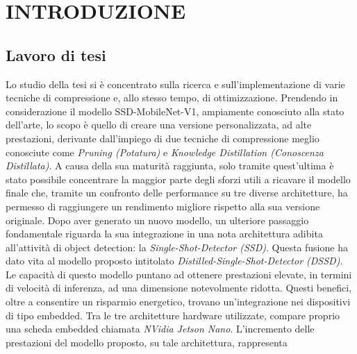 
\chapter{INTRODUZIONE}
\label{Capitolo1}
\thispagestyle{empty}

\section{Lavoro di tesi}
Lo studio della tesi si è concentrato sulla ricerca e sull'implementazione 
di varie tecniche di compressione e, allo stesso tempo, di ottimizzazione. 
Prendendo in considerazione il modello SSD-MobileNet-V1, ampiamente 
conosciuto alla stato dell'arte, lo scopo è quello di creare una versione 
personalizzata, ad alte prestazioni, derivante dall'impiego di due tecniche 
di compressione meglio conosciute come \emph{Pruning (Potatura)} e \emph{Knowledge 
Distillation (Conoscenza Distillata)}. A causa della sua maturità 
raggiunta, solo tramite quest'ultima è stato possibile concentrare la maggior parte 
degli sforzi utili a ricavare il modello finale che, tramite un confronto delle 
performance su tre diverse architetture, ha permesso di raggiungere un 
rendimento migliore rispetto alla sua versione originale. Dopo aver generato 
un nuovo modello, un ulteriore passaggio fondamentale riguarda la 
sua integrazione in una nota architettura adibita all'attività di object detection: 
la \emph{Single-Shot-Detector (SSD)}. Questa fusione ha dato vita al modello proposto 
intitolato \emph{Distilled-Single-Shot-Detector (DSSD)}. Le capacità di 
questo modello puntano ad ottenere prestazioni elevate, in termini di velocità di 
inferenza, ad una dimensione notevolmente ridotta. Questi benefici, oltre a 
consentire un risparmio energetico, trovano un'integrazione nei dispositivi 
di tipo embedded. Tra le tre architetture hardware utilizzate, compare 
proprio una scheda embedded chiamata \emph{NVidia Jetson Nano}. L'incremento 
delle prestazioni del modello proposto, su tale architettura, rappresenta 
